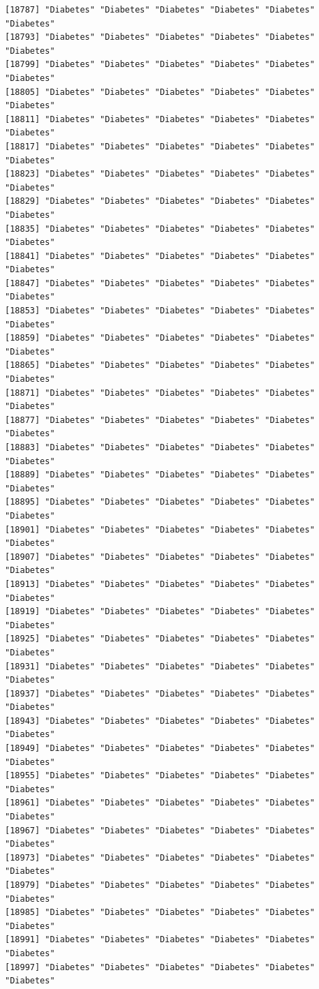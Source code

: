 \documentclass[
  letterpaper,
  DIV=11,
  numbers=noendperiod]{scrartcl}
\begin{document}
\begin{verbatim}
[18787] "Diabetes" "Diabetes" "Diabetes" "Diabetes" "Diabetes" "Diabetes"
[18793] "Diabetes" "Diabetes" "Diabetes" "Diabetes" "Diabetes" "Diabetes"
[18799] "Diabetes" "Diabetes" "Diabetes" "Diabetes" "Diabetes" "Diabetes"
[18805] "Diabetes" "Diabetes" "Diabetes" "Diabetes" "Diabetes" "Diabetes"
[18811] "Diabetes" "Diabetes" "Diabetes" "Diabetes" "Diabetes" "Diabetes"
[18817] "Diabetes" "Diabetes" "Diabetes" "Diabetes" "Diabetes" "Diabetes"
[18823] "Diabetes" "Diabetes" "Diabetes" "Diabetes" "Diabetes" "Diabetes"
[18829] "Diabetes" "Diabetes" "Diabetes" "Diabetes" "Diabetes" "Diabetes"
[18835] "Diabetes" "Diabetes" "Diabetes" "Diabetes" "Diabetes" "Diabetes"
[18841] "Diabetes" "Diabetes" "Diabetes" "Diabetes" "Diabetes" "Diabetes"
[18847] "Diabetes" "Diabetes" "Diabetes" "Diabetes" "Diabetes" "Diabetes"
[18853] "Diabetes" "Diabetes" "Diabetes" "Diabetes" "Diabetes" "Diabetes"
[18859] "Diabetes" "Diabetes" "Diabetes" "Diabetes" "Diabetes" "Diabetes"
[18865] "Diabetes" "Diabetes" "Diabetes" "Diabetes" "Diabetes" "Diabetes"
[18871] "Diabetes" "Diabetes" "Diabetes" "Diabetes" "Diabetes" "Diabetes"
[18877] "Diabetes" "Diabetes" "Diabetes" "Diabetes" "Diabetes" "Diabetes"
[18883] "Diabetes" "Diabetes" "Diabetes" "Diabetes" "Diabetes" "Diabetes"
[18889] "Diabetes" "Diabetes" "Diabetes" "Diabetes" "Diabetes" "Diabetes"
[18895] "Diabetes" "Diabetes" "Diabetes" "Diabetes" "Diabetes" "Diabetes"
[18901] "Diabetes" "Diabetes" "Diabetes" "Diabetes" "Diabetes" "Diabetes"
[18907] "Diabetes" "Diabetes" "Diabetes" "Diabetes" "Diabetes" "Diabetes"
[18913] "Diabetes" "Diabetes" "Diabetes" "Diabetes" "Diabetes" "Diabetes"
[18919] "Diabetes" "Diabetes" "Diabetes" "Diabetes" "Diabetes" "Diabetes"
[18925] "Diabetes" "Diabetes" "Diabetes" "Diabetes" "Diabetes" "Diabetes"
[18931] "Diabetes" "Diabetes" "Diabetes" "Diabetes" "Diabetes" "Diabetes"
[18937] "Diabetes" "Diabetes" "Diabetes" "Diabetes" "Diabetes" "Diabetes"
[18943] "Diabetes" "Diabetes" "Diabetes" "Diabetes" "Diabetes" "Diabetes"
[18949] "Diabetes" "Diabetes" "Diabetes" "Diabetes" "Diabetes" "Diabetes"
[18955] "Diabetes" "Diabetes" "Diabetes" "Diabetes" "Diabetes" "Diabetes"
[18961] "Diabetes" "Diabetes" "Diabetes" "Diabetes" "Diabetes" "Diabetes"
[18967] "Diabetes" "Diabetes" "Diabetes" "Diabetes" "Diabetes" "Diabetes"
[18973] "Diabetes" "Diabetes" "Diabetes" "Diabetes" "Diabetes" "Diabetes"
[18979] "Diabetes" "Diabetes" "Diabetes" "Diabetes" "Diabetes" "Diabetes"
[18985] "Diabetes" "Diabetes" "Diabetes" "Diabetes" "Diabetes" "Diabetes"
[18991] "Diabetes" "Diabetes" "Diabetes" "Diabetes" "Diabetes" "Diabetes"
[18997] "Diabetes" "Diabetes" "Diabetes" "Diabetes" "Diabetes" "Diabetes"

\end{verbatim}
\end{document}
